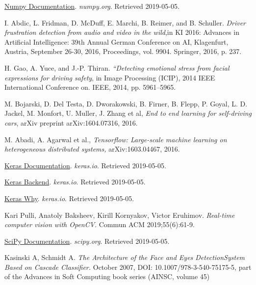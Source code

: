 \documentclass{article}
\begin{document}
\begin{thebibliography}{1}
    \href{https://www.numpy.org/}{Numpy Documentation}. \textit{numpy.org}. Retrieved 2019-05-05.
    
    I. Abdic, L. Fridman, D. McDuff, E. Marchi, B. Reimer, and B. Schuller.
    \textit{Driver frustration detection from audio and video in the wild},in KI 2016: Advances in Artificial Intelligence: 39th Annual German Conference on AI, Klagenfurt, Austria, September 26-30, 2016, Proceedings, vol. 9904. Springer, 2016, p. 237.
    
    H. Gao, A. Yuce, and J.-P. Thiran.
    \textit{“Detecting emotional stress from facial expressions for driving safety}, in Image Processing (ICIP), 2014 IEEE International Conference on. IEEE, 2014, pp. 5961–5965.
    
    M. Bojarski, D. Del Testa, D. Dworakowski, B. Firner, B. Flepp, P. Goyal, L. D. Jackel, M. Monfort, U. Muller, J. Zhang et al, 
    \textit{End to end learning for self-driving cars}, arXiv preprint arXiv:1604.07316, 2016.
    
    M. Abadi, A. Agarwal et al.,
    \textit{Tensorflow: Large-scale machine learning on heterogeneous distributed systems,} arXiv:1603.04467, 2016.
    
    \href{https://keras.io/#why-this-name-keras}{Keras Documentation}. \textit{keras.io}. Retrieved 2019-05-05.
    
    \href{https://keras.io/backend/}{Keras Backend}. \textit{keras.io}. Retrieved 2019-05-05.
    
    \href{https://keras.io/why-use-keras/}{Keras Why}. \textit{keras.io}. Retrieved 2019-05-05.
    
    Kari Pulli, Anatoly Baksheev, Kirill Kornyakov, Victor Eruhimov. \textit{Real-time computer vision with OpenCV}. Commun ACM 2019;55(6):61-9.
    
    \href{https://docs.scipy.org/doc/scipy/reference/tutorial/general.html}{SciPy Documentation}. \textit{scipy.org}. Retrieved 2019-05-05.
    
    Kasinski A, Schmidt A. \textit{The Architecture of the Face and Eyes DetectionSystem Based on Cascade Classifier.} October 2007, DOI: 10.1007/978-3-540-75175-5, part of the Advances in Soft Computing book series (AINSC, volume 45)
    

\end{thebibliography}
\end{document}
